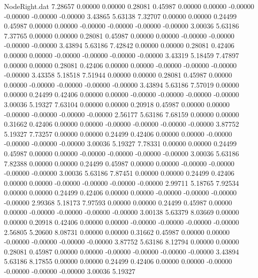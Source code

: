 \begin{filecontents}{NodeRight.dat}
   7.28657    0.00000    0.00000     0.28081    0.45987    0.00000    0.00000   -0.00000   -0.00000   -0.00000   -0.00000    3.43865    5.63138
   7.32707    0.00000    0.00000     0.24499    0.45987    0.00000    0.00000   -0.00000   -0.00000   -0.00000   -0.00000    3.00036    5.63186
   7.37765    0.00000    0.00000     0.28081    0.45987    0.00000    0.00000   -0.00000   -0.00000   -0.00000   -0.00000    3.43894    5.63186
   7.42842    0.00000    0.00000     0.28081    0.42406    0.00000    0.00000   -0.00000   -0.00000   -0.00000   -0.00000    3.43319    5.18459
   7.47897    0.00000    0.00000     0.28081    0.42406    0.00000    0.00000   -0.00000   -0.00000   -0.00000   -0.00000    3.43358    5.18518
   7.51944    0.00000    0.00000     0.28081    0.45987    0.00000    0.00000   -0.00000   -0.00000   -0.00000   -0.00000    3.43894    5.63186
   7.57019    0.00000    0.00000     0.24499    0.42406    0.00000    0.00000   -0.00000   -0.00000   -0.00000   -0.00000    3.00036    5.19327
   7.63104    0.00000    0.00000     0.20918    0.45987    0.00000    0.00000   -0.00000   -0.00000   -0.00000   -0.00000    2.56177    5.63186
   7.68159    0.00000    0.00000     0.31662    0.42406    0.00000    0.00000   -0.00000   -0.00000   -0.00000   -0.00000    3.87752    5.19327
   7.73257    0.00000    0.00000     0.24499    0.42406    0.00000    0.00000   -0.00000   -0.00000   -0.00000   -0.00000    3.00036    5.19327
   7.78331    0.00000    0.00000     0.24499    0.45987    0.00000    0.00000   -0.00000   -0.00000   -0.00000   -0.00000    3.00036    5.63186
   7.82388    0.00000    0.00000     0.24499    0.45987    0.00000    0.00000   -0.00000   -0.00000   -0.00000   -0.00000    3.00036    5.63186
   7.87451    0.00000    0.00000     0.24499    0.42406    0.00000    0.00000   -0.00000   -0.00000   -0.00000   -0.00000    2.99711    5.18765
   7.92534    0.00000    0.00000     0.24499    0.42406    0.00000    0.00000   -0.00000   -0.00000   -0.00000   -0.00000    2.99368    5.18173
   7.97593    0.00000    0.00000     0.24499    0.45987    0.00000    0.00000   -0.00000   -0.00000   -0.00000   -0.00000    3.00138    5.63379
   8.03669    0.00000    0.00000     0.20918    0.42406    0.00000    0.00000   -0.00000   -0.00000   -0.00000   -0.00000    2.56805    5.20600
   8.08731    0.00000    0.00000     0.31662    0.45987    0.00000    0.00000   -0.00000   -0.00000   -0.00000   -0.00000    3.87752    5.63186
   8.12794    0.00000    0.00000     0.28081    0.45987    0.00000    0.00000   -0.00000   -0.00000   -0.00000   -0.00000    3.43894    5.63186
   8.17855    0.00000    0.00000     0.24499    0.42406    0.00000    0.00000   -0.00000   -0.00000   -0.00000   -0.00000    3.00036    5.19327

\end{filecontents}
